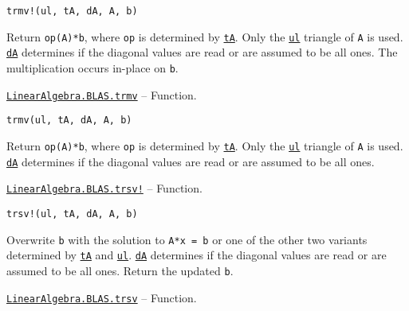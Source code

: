 \begin{adjustwidth}{2em}{0pt}


\begin{verbatim}
trmv!(ul, tA, dA, A, b)
\end{verbatim}

Return \texttt{op(A)*b}, where \texttt{op} is determined by \hyperlink{15951037910221396131}{\texttt{tA}}. Only the \hyperlink{13880289478825450693}{\texttt{ul}} triangle of \texttt{A} is used. \hyperlink{285101993251198425}{\texttt{dA}} determines if the diagonal values are read or are assumed to be all ones. The multiplication occurs in-place on \texttt{b}.



\end{adjustwidth}
\hypertarget{17600708624629588635}{} 
\hyperlink{17600708624629588635}{\texttt{LinearAlgebra.BLAS.trmv}}  -- {Function.}

\begin{adjustwidth}{2em}{0pt}


\begin{verbatim}
trmv(ul, tA, dA, A, b)
\end{verbatim}

Return \texttt{op(A)*b}, where \texttt{op} is determined by \hyperlink{15951037910221396131}{\texttt{tA}}. Only the \hyperlink{13880289478825450693}{\texttt{ul}} triangle of \texttt{A} is used. \hyperlink{285101993251198425}{\texttt{dA}} determines if the diagonal values are read or are assumed to be all ones.



\end{adjustwidth}
\hypertarget{10791367515297146957}{} 
\hyperlink{10791367515297146957}{\texttt{LinearAlgebra.BLAS.trsv!}}  -- {Function.}

\begin{adjustwidth}{2em}{0pt}


\begin{verbatim}
trsv!(ul, tA, dA, A, b)
\end{verbatim}

Overwrite \texttt{b} with the solution to \texttt{A*x = b} or one of the other two variants determined by \hyperlink{15951037910221396131}{\texttt{tA}} and \hyperlink{13880289478825450693}{\texttt{ul}}. \hyperlink{285101993251198425}{\texttt{dA}} determines if the diagonal values are read or are assumed to be all ones. Return the updated \texttt{b}.



\end{adjustwidth}
\hypertarget{14529375247847983227}{} 
\hyperlink{14529375247847983227}{\texttt{LinearAlgebra.BLAS.trsv}}  -- {Function.}

